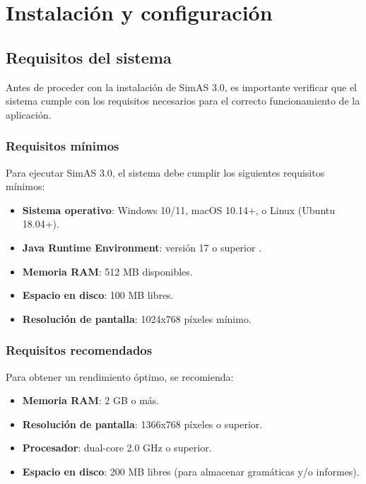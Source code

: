 \chapter{Instalación y configuración}

\section{Requisitos del sistema}

Antes de proceder con la instalación de SimAS 3.0, es importante verificar que el sistema cumple con los requisitos necesarios para el correcto funcionamiento de la aplicación.

\subsection{Requisitos mínimos}

Para ejecutar SimAS 3.0, el sistema debe cumplir los siguientes requisitos mínimos:

\begin{itemize}
    \item \textbf{Sistema operativo}: Windows 10/11, macOS 10.14+, o Linux (Ubuntu 18.04+).
    \item \textbf{Java Runtime Environment}: versión 17 o superior \cite{java}.
    \item \textbf{Memoria RAM}: 512 MB disponibles.
    \item \textbf{Espacio en disco}: 100 MB libres.
    \item \textbf{Resolución de pantalla}: 1024x768 píxeles mínimo.
\end{itemize}

\subsection{Requisitos recomendados}

Para obtener un rendimiento óptimo, se recomienda:

\begin{itemize}
    \item \textbf{Memoria RAM}: 2 GB o más.
    \item \textbf{Resolución de pantalla}: 1366x768 píxeles o superior.
    \item \textbf{Procesador}: dual-core 2.0 GHz o superior.
    \item \textbf{Espacio en disco}: 200 MB libres (para almacenar gramáticas y/o informes).
\end{itemize}

